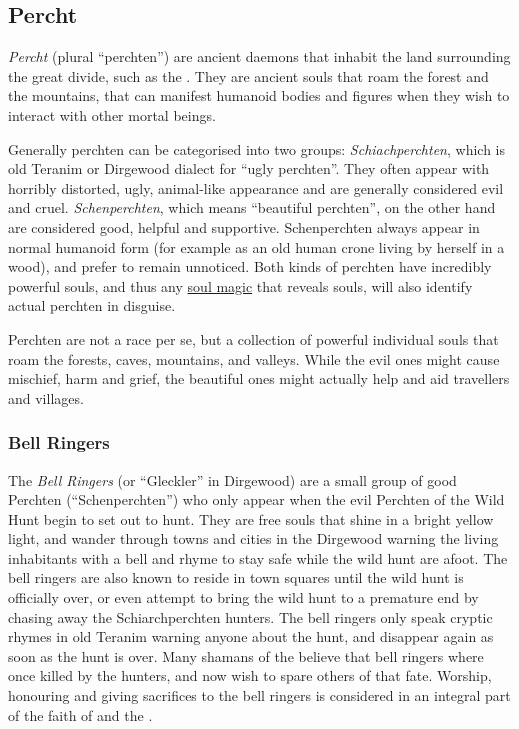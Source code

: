 \subsection{Percht}
\label{sec:Percht}

\emph{Percht} (plural ``perchten'') are ancient daemons that inhabit the
land surrounding the great divide, such as the . They
are ancient souls that roam the forest and the mountains, that can manifest
humanoid bodies and figures when they wish to interact with other mortal
beings.

Generally perchten can be categorised into two groups: \emph{Schiachperchten},
which is old Teranim or Dirgewood dialect for ``ugly perchten''. They often
appear with horribly distorted, ugly, animal-like appearance and are generally
considered evil and cruel. \emph{Schenperchten}, which means ``beautiful
perchten'', on the other hand are considered good, helpful and
supportive. Schenperchten always appear in normal humanoid form (for example
as an old human crone living by herself in a wood), and prefer to remain
unnoticed. Both kinds of perchten have incredibly powerful souls, and thus
any \hyperref[sec:Soul Magic]{soul magic} that reveals souls, will also
identify actual perchten in disguise.

Perchten are not a race per se, but a collection of powerful individual souls
that roam the forests, caves, mountains, and valleys. While the evil ones might
cause mischief, harm and grief, the beautiful ones might actually help and aid
travellers and villages.

\subsubsection{Bell Ringers}
\label{sec:Bell Ringers}

The \emph{Bell Ringers} (or ``Gleckler'' in Dirgewood) are a small group of
good Perchten (``Schenperchten'') who only appear when the evil Perchten
of the Wild Hunt begin to set out to hunt. They are free souls that shine
in a bright yellow light, and wander through towns and cities in the Dirgewood
warning the living inhabitants with a bell and rhyme to stay safe while
the wild hunt are afoot. The bell ringers are also known to reside in town
squares until the wild hunt is officially over, or even attempt to bring the
wild hunt to a premature end by chasing away the Schiarchperchten hunters. The
bell ringers only speak cryptic rhymes in old Teranim warning anyone about
the hunt, and disappear again as soon as the hunt is over. Many shamans of the
 believe that bell ringers where once killed by the
hunters, and now wish to spare others of that fate. Worship, honouring and
giving sacrifices to the bell ringers is considered in an integral part of the
faith of  and the .

